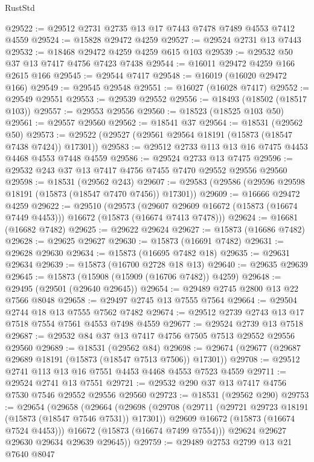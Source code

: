 \begin{lexlean}{RustStd}
\begin{coremodule}
@29522 := @29512 @2731 @2735 @13 @17 @7443 @7478 @7489 @4553 @7412 @4559
@29524 := @15828 @29472 @4259
@29527 := @29524 @2731 @13 @7443
@29532 := @18468 @29472 @4259 @4259 @615 @103
@29539 := @29532 @50 @37 @13 @7417 @4756 @7423 @7438
@29544 := @16011 @29472 @4259 @166 @2615 @166
@29545 := @29544 @7417
@29548 := @16019 (@16020 @29472 @166)
@29549 := @29545 @29548
@29551 := @16027 (@16028 @7417)
@29552 := @29549 @29551
@29553 := @29539 @29552
@29556 := @18493 (@18502 (@18517 @103))
@29557 := @29553 @29556
@29560 := @18523 (@18525 @103 @50)
@29561 := @29557 @29560
@29562 := @18541 @37
@29564 := @18531 (@29562 @50)
@29573 := @29522 (@29527 (@29561 @29564 @18191 (@15873 (@18547 @7438 @7424)) @17301))
@29583 := @29512 @2733 @113 @13 @16 @7475 @4453 @4468 @4553 @7448 @4559
@29586 := @29524 @2733 @13 @7475
@29596 := @29532 @243 @37 @13 @7417 @4756 @7455 @7470 @29552 @29556 @29560
@29598 := @18531 (@29562 @243)
@29607 := @29583 (@29586 (@29596 @29598 @18191 (@15873 (@18547 @7470 @7456)) @17301))
@29609 := @16666 @29472 @4259
@29622 := @29510
    (@29573
      (@29607 @29609 @16672 (@15873 (@16674 @7449 @4453)))
      @16672
      (@15873 (@16674 @7413 @7478)))
@29624 := @16681 (@16682 @7482)
@29625 := @29622 @29624
@29627 := @15873 (@16686 @7482)
@29628 := @29625 @29627
@29630 := @15873 (@16691 @7482)
@29631 := @29628 @29630
@29634 := @15873 (@16695 @7482 @18)
@29635 := @29631 @29634
@29639 := @15873 (@16700 @2728 @18 @13)
@29640 := @29635 @29639
@29645 := @15873 (@15908 (@15909 (@16706 @7482)) @4259)
@29648 := @29495 (@29501 (@29640 @29645))
@29654 := @29489 @2745 @2800 @13 @22 @7566 @8048
@29658 := @29497 @2745 @13 @7555 @7564
@29664 := @29504 @2744 @18 @13 @7555 @7562 @7482
@29674 := @29512 @2739 @2743 @13 @17 @7518 @7554 @7561 @4553 @7498 @4559
@29677 := @29524 @2739 @13 @7518
@29687 := @29532 @84 @37 @13 @7417 @4756 @7505 @7513 @29552 @29556 @29560
@29689 := @18531 (@29562 @84)
@29698 := @29674 (@29677 (@29687 @29689 @18191 (@15873 (@18547 @7513 @7506)) @17301))
@29708 := @29512 @2741 @113 @13 @16 @7551 @4453 @4468 @4553 @7523 @4559
@29711 := @29524 @2741 @13 @7551
@29721 := @29532 @290 @37 @13 @7417 @4756 @7530 @7546 @29552 @29556 @29560
@29723 := @18531 (@29562 @290)
@29753 := @29654
    (@29658
      (@29664
        (@29698
          (@29708
            (@29711 (@29721 @29723 @18191 (@15873 (@18547 @7546 @7531)) @17301))
            @29609
            @16672
            (@15873 (@16674 @7524 @4453)))
          @16672
          (@15873 (@16674 @7499 @7554)))
        @29624
        @29627
        @29630
        @29634
        @29639
        @29645))
@29759 := @29489 @2753 @2799 @13 @21 @7640 @8047

\end{coremodule}
\end{lexlean}
